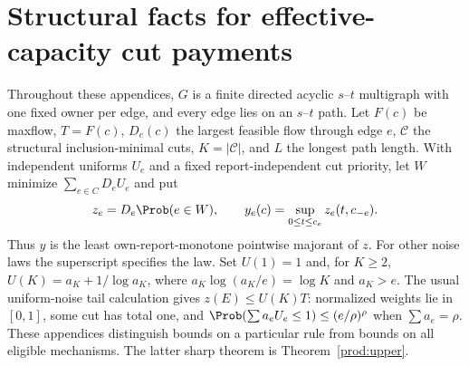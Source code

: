 \section{Structural facts for effective-capacity cut payments}\label{noise:structure}
Throughout these appendices, $G$ is a finite directed acyclic $s$--$t$
multigraph with one fixed owner per edge, and every edge lies on an $s$--$t$
path. Let $F(c)$ be maxflow, $T=F(c)$, $D_e(c)$ the largest feasible flow
through edge $e$, $\mathcal C$ the structural inclusion-minimal cuts,
$K=|\mathcal C|$, and $L$ the longest path length. With independent uniforms
$U_e$ and a fixed report-independent cut priority, let $W$ minimize
$\sum_{e\in C}D_eU_e$ and put
\[
 z_e=D_e\Prob(e\in W),\qquad y_e(c)=\sup_{0\le t\le c_e}z_e(t,c_{-e}).
\]
Thus $y$ is the least own-report-monotone pointwise majorant of $z$.
For other noise laws the superscript specifies the law. Set $U(1)=1$ and,
for $K\ge2$, $U(K)=a_K+1/\log a_K$, where
$a_K\log(a_K/e)=\log K$ and $a_K>e$.
The usual uniform-noise tail calculation gives $z(E)\le U(K)T$:
normalized weights lie in $[0,1]$, some cut has total one, and
$\Prob(\sum a_eU_e\le1)\le(e/\rho)^\rho$ when $\sum a_e=\rho$.
These appendices distinguish bounds on a particular rule from bounds on
all eligible mechanisms. The latter sharp theorem is Theorem~\ref{prod:upper}.

